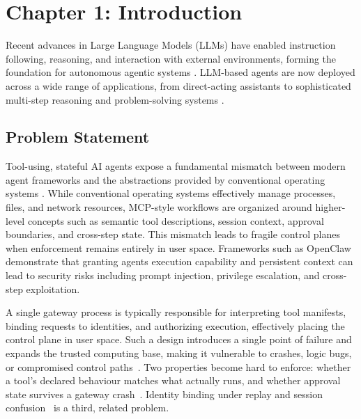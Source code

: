 \section*{Chapter 1: Introduction}
\setcounter{section}{1} \setcounter{subsection}{0}
 \label{chap:introduction} 

Recent advances in Large Language Models (LLMs) have enabled instruction following, reasoning, and interaction with external environments, forming the foundation for autonomous agentic systems \cite{yao2023react, liu2024agentbench, schick2023toolformer}.
LLM-based agents are now deployed across a wide range of applications, from direct-acting assistants to sophisticated multi-step reasoning and problem-solving systems \cite{park2023generative, qin2024toolllm, mei2024aios, liu2026agentos}.

\subsection{Problem Statement}

Tool-using, stateful AI agents expose a fundamental mismatch between modern agent frameworks and the abstractions provided by conventional operating systems \cite{packer2023memgpt, mei2024aios}.
While conventional operating systems effectively manage processes, files, and network resources, MCP-style workflows are organized around higher-level concepts such as semantic tool descriptions, session context, approval boundaries, and cross-step state.
This mismatch leads to fragile control planes when enforcement remains entirely in user space. 
Frameworks such as OpenClaw~\cite{openclaw2026} demonstrate that granting agents execution capability and persistent context can lead to security risks including prompt injection, privilege escalation, and cross-step exploitation. 

A single gateway process is typically responsible for interpreting tool manifests, binding requests to identities, and authorizing execution, effectively placing the control plane in user space. 
Such a design introduces a single point of failure and expands the trusted computing base, making it vulnerable to crashes, logic bugs, or compromised control paths~\cite{peter2014arrakis}.
Two properties become hard to enforce: whether a tool's declared behaviour matches what actually runs, and whether approval state survives a gateway crash~\cite{qin2024toolllm}.
Identity binding under replay and session confusion~\cite{greshake2023prompt} is a third, related problem.

